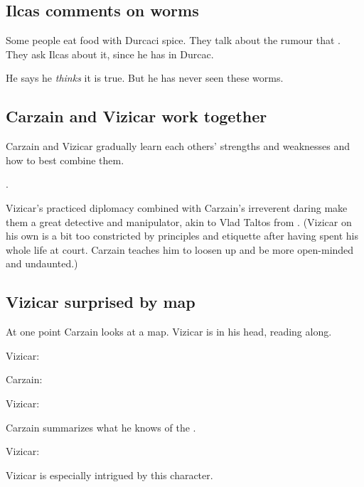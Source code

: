 \subsection{Ilcas comments on worms}
Some people eat food with Durcaci spice. 
They talk about the rumour that . 
They ask Ilcas about it, since he has \travelled in Durcac. 

He says he \emph{thinks} it is true. 
But he has never seen these worms. 









\subsection{Carzain and Vizicar work together}
Carzain and Vizicar gradually learn each others' strengths and weaknesses and how to best combine them. 

. 

Vizicar's practiced diplomacy combined with Carzain's irreverent daring make them a great detective and manipulator, akin to Vlad Taltos from . 
(Vizicar on his own is a bit too constricted by principles and etiquette after having spent his whole life at court. Carzain teaches him to loosen up and be more open-minded and undaunted.)







\subsection{Vizicar surprised by map}
At one point Carzain looks at a map. 
Vizicar is in his head, reading along. 

\begin{prose}
  Vizicar: 
  
  Carzain: 
  
  Vizicar: 
  
  Carzain summarizes what he knows of the \Darkfall. 
  
  Vizicar: 
  
  Vizicar is especially intrigued by this  character. 
\end{prose}







